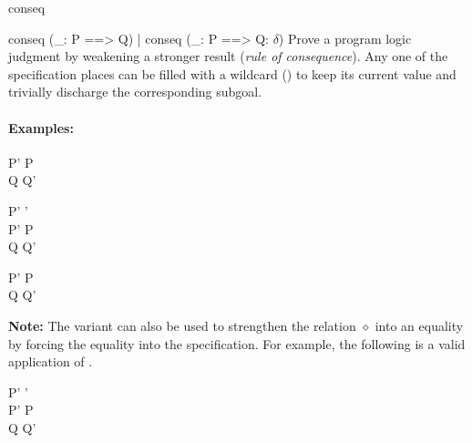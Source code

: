 \begin{tactic}{conseq}
  \begin{tsyntax}{conseq (_: P ==> Q) | conseq (_: P ==> Q: $\delta$)}
  Prove a program logic judgment by weakening a stronger result
  (\emph{rule of consequence}). Any one of the specification places
  can be filled with a wildcard (\ec{_}) to keep its current value and
  trivially discharge the corresponding subgoal.

  \paragraph{Examples:}\strut
  
  \begin{cmathpar}
    {P' \Rightarrow P \\ Q \Rightarrow Q' \\ }
    {}

    {P' \Rightarrow \delta \mathrel{\diamond} \delta' \\
     P' \Rightarrow P \\
     Q \mathrel{\diamond^\uparrow} Q' \\
     }
    {}

    {P' \Rightarrow P \\ Q \Rightarrow Q' \\ }
    {}
  \end{cmathpar}

  \textbf{Note:} The \phl variant can also be used to strengthen the
  relation $\diamond$ into an equality by forcing the equality into
  the specification. For example, the following is a valid application
  of .

  \begin{cmathpar}
    {P' \Rightarrow \delta \mathrel{=} \delta' \\
     P' \Rightarrow P \\
     Q \mathrel{\Leftrightarrow} Q' \
     }
    {}
  \end{cmathpar}  
  \end{tsyntax}


\end{tactic}
